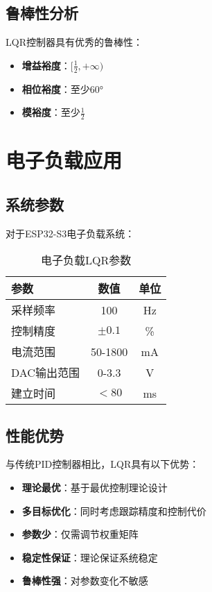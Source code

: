 \documentclass{article}
\begin{document}
\subsection{鲁棒性分析}

LQR控制器具有优秀的鲁棒性：
\begin{itemize}
    \item \textbf{增益裕度}：$[\frac{1}{2}, +\infty)$
    \item \textbf{相位裕度}：至少$60°$
    \item \textbf{模裕度}：至少$\frac{1}{2}$
\end{itemize}

\section{电子负载应用}

\subsection{系统参数}

对于ESP32-S3电子负载系统：

\begin{table}[h]
\centering
\caption{电子负载LQR参数}
\begin{tabular}{|l|c|c|}
\hline
参数 & 数值 & 单位 \\
\hline
采样频率 & 100 & Hz \\
控制精度 & $\pm 0.1$ & \% \\
电流范围 & 50-1800 & mA \\
DAC输出范围 & 0-3.3 & V \\
建立时间 & $< 80$ & ms \\
\hline
\end{tabular}
\end{table}

\subsection{性能优势}

与传统PID控制器相比，LQR具有以下优势：

\begin{itemize}
    \item \textbf{理论最优}：基于最优控制理论设计
    \item \textbf{多目标优化}：同时考虑跟踪精度和控制代价
    \item \textbf{参数少}：仅需调节权重矩阵
    \item \textbf{稳定性保证}：理论保证系统稳定
    \item \textbf{鲁棒性强}：对参数变化不敏感
\end{itemize}
\end{document}
